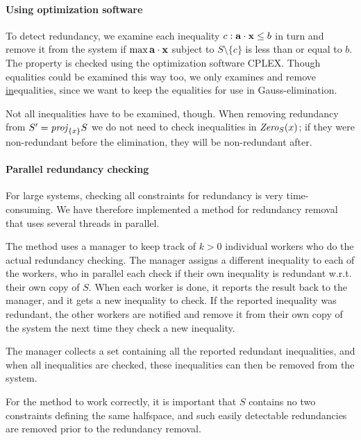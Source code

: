 \paragraph{Using optimization software}
To detect redundancy, we examine each inequality $c: \mathbf{a}\cdot \mathbf{x}\leq b$ in turn and remove it from the system if $\max \mathbf{a}\cdot \mathbf{x}$ subject to $S\setminus\{c\}$ is less than or equal to $b$. The property is checked using the optimization software CPLEX. Though equalities could be examined this way too, we only examines and remove \underline{in}equalities, since we want to keep the equalities for use in Gauss-elimination.

Not all inequalities have to be examined, though. When removing redundancy from $S' = \mathit{proj}_{\{x\}}S$ we do not need to check inequalities in $\mathit{Zero}_S(x)$; if they were non-redundant before the elimination, they will be non-redundant after.

\paragraph{Parallel redundancy checking}
For large systems, checking all constraints for redundancy is very time-consuming. We have therefore implemented a method for redundancy removal that uses several threads in parallel. 

The method uses a manager to keep track of $k>0$ individual workers who do the actual redundancy checking.
The manager assigns a different inequality to each of the workers, who in parallel each check if their own inequality is redundant w.r.t. their own copy of $S$. When each worker is done, it reports the result back to the manager, and it gets a new inequality to check.  
If the reported inequality was redundant, the other workers are notified and remove it from their own copy of the system the next time they check a new inequality. 

The manager collects a set containing all the reported redundant inequalities, and when all inequalities are checked, these inequalities can then be removed from the system.

For the method to work correctly, it is important that $S$ contains no two constraints defining the same halfspace, and such easily detectable redundancies are removed prior to the redundancy removal.

